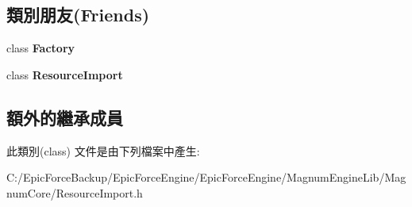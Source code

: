 \subsection*{類別朋友(Friends)}
\begin{DoxyCompactItemize}
\item 
class {\bfseries Factory}\hypertarget{class_magnum_1_1_resource_import_1_1_creator_a328c093d609680cca505905c6d49901a}{}\label{class_magnum_1_1_resource_import_1_1_creator_a328c093d609680cca505905c6d49901a}

\item 
class {\bfseries Resource\+Import}\hypertarget{class_magnum_1_1_resource_import_1_1_creator_a886ab3c64485d3e65d51d9b87a500080}{}\label{class_magnum_1_1_resource_import_1_1_creator_a886ab3c64485d3e65d51d9b87a500080}

\end{DoxyCompactItemize}
\subsection*{額外的繼承成員}


此類別(class) 文件是由下列檔案中產生\+:\begin{DoxyCompactItemize}
\item 
C\+:/\+Epic\+Force\+Backup/\+Epic\+Force\+Engine/\+Epic\+Force\+Engine/\+Magnum\+Engine\+Lib/\+Magnum\+Core/Resource\+Import.\+h\end{DoxyCompactItemize}
